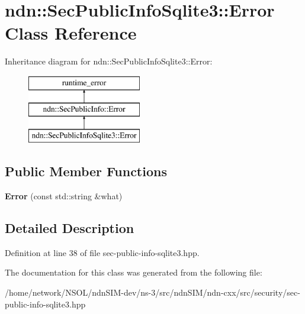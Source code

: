\hypertarget{classndn_1_1SecPublicInfoSqlite3_1_1Error}{}\section{ndn\+:\+:Sec\+Public\+Info\+Sqlite3\+:\+:Error Class Reference}
\label{classndn_1_1SecPublicInfoSqlite3_1_1Error}
Inheritance diagram for ndn\+:\+:Sec\+Public\+Info\+Sqlite3\+:\+:Error\+:\begin{figure}[H]
\begin{center}
\leavevmode
\includegraphics[height=3.000000cm]{classndn_1_1SecPublicInfoSqlite3_1_1Error}
\end{center}
\end{figure}
\subsection*{Public Member Functions}
\begin{DoxyCompactItemize}
\item 
{\bfseries Error} (const std\+::string \&what)\hypertarget{classndn_1_1SecPublicInfoSqlite3_1_1Error_a2d7c0ce9bbd165c99601e34422d05355}{}\label{classndn_1_1SecPublicInfoSqlite3_1_1Error_a2d7c0ce9bbd165c99601e34422d05355}

\end{DoxyCompactItemize}


\subsection{Detailed Description}


Definition at line 38 of file sec-\/public-\/info-\/sqlite3.\+hpp.



The documentation for this class was generated from the following file\+:\begin{DoxyCompactItemize}
\item 
/home/network/\+N\+S\+O\+L/ndn\+S\+I\+M-\/dev/ns-\/3/src/ndn\+S\+I\+M/ndn-\/cxx/src/security/sec-\/public-\/info-\/sqlite3.\+hpp\end{DoxyCompactItemize}
